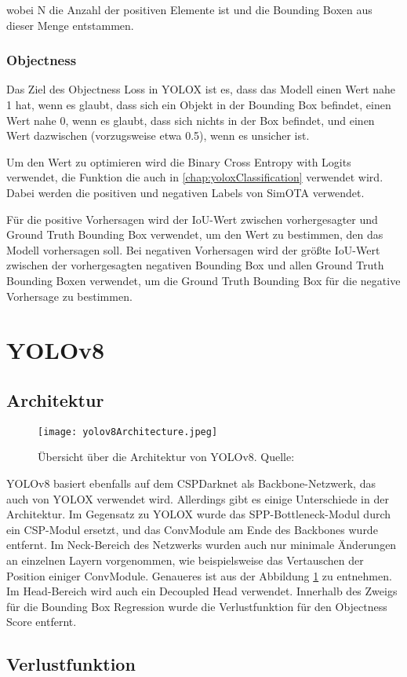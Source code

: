 wobei N die Anzahl der positiven Elemente ist und die Bounding Boxen aus dieser Menge entstammen. \cite{yoloxExplanationHowWorks}

\subsubsection{Objectness}
Das Ziel des Objectness Loss in YOLOX ist es, dass das Modell einen Wert nahe 1 hat, wenn es glaubt, dass sich ein Objekt in der Bounding Box befindet, einen Wert nahe 0, wenn es glaubt, dass sich nichts in der Box befindet, und einen Wert dazwischen (vorzugsweise etwa 0.5), wenn es unsicher ist.

Um den Wert zu optimieren wird die Binary Cross Entropy with Logits verwendet, die Funktion die auch in \ref{chap:yoloxClassification} verwendet wird. Dabei werden die positiven und negativen Labels von SimOTA verwendet.

Für die positive Vorhersagen wird der IoU-Wert zwischen vorhergesagter und Ground Truth Bounding Box verwendet, um den Wert zu bestimmen, den das Modell vorhersagen soll. Bei negativen Vorhersagen wird der größte IoU-Wert zwischen der vorhergesagten negativen Bounding Box und allen Ground Truth Bounding Boxen verwendet, um die Ground Truth Bounding Box für die negative Vorhersage zu bestimmen. \cite{yoloxExplanationHowWorks}


\section{YOLOv8}\label{chap:yolov8}
\subsection{Architektur}
\begin{figure}[h]
	\centering
	\texttt{[image: yolov8Architecture.jpeg]}
	\caption[Übersicht über die Architektur von YOLOv8]{Übersicht über die Architektur von YOLOv8. Quelle: \cite{yoloArchitecture}}
	\label{fig:yolov8Architecture}
\end{figure}

YOLOv8 basiert ebenfalls auf dem CSPDarknet als Backbone-Netzwerk, das auch von YOLOX verwendet wird. Allerdings gibt es einige Unterschiede in der Architektur. Im Gegensatz zu YOLOX wurde das SPP-Bottleneck-Modul durch ein CSP-Modul ersetzt, und das ConvModule am Ende des Backbones wurde entfernt. Im Neck-Bereich des Netzwerks wurden auch nur minimale Änderungen an einzelnen Layern vorgenommen, wie beispielsweise das Vertauschen der Position einiger ConvModule. Genaueres ist aus der Abbildung \ref{fig:yolov8Architecture} zu entnehmen. Im Head-Bereich wird auch ein Decoupled Head verwendet. Innerhalb des Zweigs für die Bounding Box Regression wurde die Verlustfunktion für den Objectness Score entfernt.


\subsection{Verlustfunktion}







